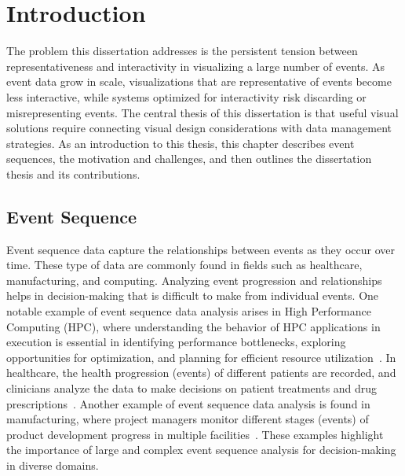 
\chapter{Introduction}
\label{chap:intro}

\begin{refsection}
The problem this dissertation addresses is the persistent tension between representativeness and interactivity in visualizing a large number of events. As event data grow in scale, visualizations that are representative of events become less interactive, while systems optimized for interactivity risk discarding or misrepresenting events. The central thesis of this dissertation is that useful visual solutions require connecting visual design considerations with data management strategies. As an introduction to this thesis, this chapter describes event sequences, the motivation and challenges, and then outlines the dissertation thesis and its contributions.

\section{Event Sequence}
\label{sec:intro-event}
Event sequence data capture the relationships between events as they occur over time. These type of data are commonly found in fields such as healthcare, manufacturing, and computing. Analyzing event progression and relationships helps in decision-making that is difficult to make from individual events. One notable example of event sequence data analysis arises in High Performance Computing (HPC), where understanding the behavior of HPC applications in execution is essential in identifying performance bottlenecks, exploring opportunities for optimization, and planning for efficient resource utilization~\cite{isaacs2014state, davidson2023qualitative}. In healthcare, the health progression (events) of different patients are recorded, and clinicians analyze the data to make decisions on patient treatments and drug prescriptions~\cite{antweiler2022uncovering, bernard2018using}. Another example of event sequence data analysis is found in manufacturing, where project managers monitor different stages (events) of product development progress in multiple facilities~\cite{lee2022linear, undozerov2021spring}. These examples highlight the importance of large and complex event sequence analysis for decision-making in diverse domains.



\end{refsection}
